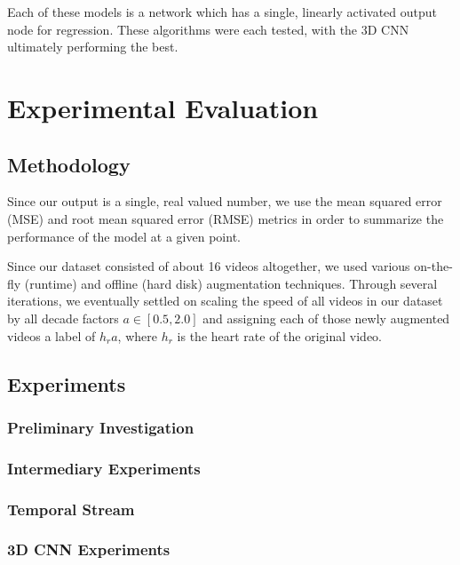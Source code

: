 \documentclass{article}
\begin{document}
\noindent Each of these models is a network which has a single, linearly activated output node for regression. These algorithms were each tested, with the 3D CNN ultimately performing the best.
\section[3]{Experimental Evaluation}
\subsection[3.1] {Methodology}
\noindent Since our output is a single, real valued number, we use the mean squared error (MSE) and root mean squared error (RMSE) metrics in order to summarize the performance of the model at a given point.

\noindent Since our dataset consisted of about 16 videos altogether, we used various on-the-fly (runtime) and offline (hard disk) augmentation techniques. Through several iterations, we eventually settled on scaling the speed of all videos in our dataset by all decade factors $a \in [0.5, 2.0]$ and assigning each of those newly augmented videos a label of $h_{r}a$, where $h_{r}$ is the heart rate of the original video. 

\subsection[3.2] {Experiments}
\subsubsection[3.2.1]{Preliminary Investigation}
\subsubsection[3.2.2]{Intermediary Experiments}
\subsubsection[3.2.3]{Temporal Stream}
\subsubsection[3.2.4]{3D CNN Experiments}
\end{document}
